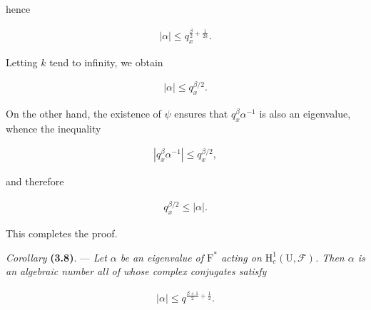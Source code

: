 \documentclass[10pt,leqno]{article}
\begin{document}
\noindent hence\par

\begin{equation*}\begin{gathered}|\alpha | \leq  q_{x}^{\frac{\beta}{2}+\frac{1}{2k}}.\end{gathered}\end{equation*}

\noindent Letting \(k\) tend to infinity, we obtain\par

\begin{equation*}\begin{gathered}|\alpha | \leq  q_{x}^{\beta /2}.\end{gathered}\end{equation*}

\noindent On the other hand, the existence of \(\psi \) ensures that \(q_{x}^{\beta } \alpha ^{- 1}\) is also an eigenvalue, whence the inequality\par

\begin{equation*}\begin{gathered}|q_{x}^{\beta } \alpha ^{- 1}| \leq  q_{x}^{\beta /2},\end{gathered}\end{equation*}

\noindent and therefore\par

\begin{equation*}\begin{gathered}q_{x}^{\beta /2} \leq  |\alpha |.\end{gathered}\end{equation*}

\noindent This completes the proof.\par

\clearpage

\label{physical-15}\par\smallskip

\noindent \emph{Corollary} \textbf{(3.8)}. — {\itshape Let \(\alpha \) be an eigenvalue of \(\mathrm{F}^{*}\) acting on \(\mathrm{H}_{c}^{1}(\mathrm{U},\mathcal{F} )\). Then \(\alpha \) is an algebraic number all of whose complex conjugates satisfy}\par

\begin{equation*}\begin{gathered}|\alpha | \leq  q^{\frac{\beta+1}{2}+\frac{1}{2}}.\end{gathered}\end{equation*}
\end{document}
